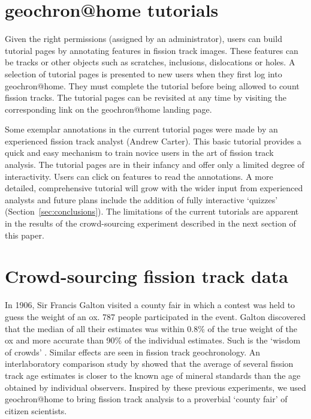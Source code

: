 \documentclass[gchron, manuscript]{copernicus}
\begin{document}
\section{geochron@home tutorials}\label{sec:tutorial}

Given the right permissions (assigned by an administrator), users can
build tutorial pages by annotating features in fission track images.
These features can be tracks or other objects such as scratches,
inclusions, dislocations or holes. A selection of tutorial pages is
presented to new users when they first log into
geochron@home. They must complete the tutorial before being
allowed to count fission tracks.  The tutorial pages can be revisited
at any time by visiting the corresponding link on the
geochron@home landing page.\medskip

Some exemplar annotations in the current tutorial pages were made by
an experienced fission track analyst (Andrew Carter). This basic
tutorial provides a quick and easy mechanism to train novice users in
the art of fission track analysis. The tutorial pages are in their
infancy and offer only a limited degree of interactivity. Users can
click on features to read the annotations. A more detailed,
comprehensive tutorial will grow with the wider input from experienced
analysts and future plans include the addition of fully interactive
`quizzes' (Section~\ref{sec:conclusions}). The limitations of the
current tutorials are apparent in the results of the crowd-sourcing
experiment described in the next section of this paper.

\section{Crowd-sourcing fission track data}\label{sec:crowdsourcing}

In 1906, Sir Francis Galton visited a county fair in which a contest
was held to guess the weight of an ox. 787 people participated in the
event. Galton discovered that the median of all their estimates was
within 0.8\% of the true weight of the ox and more accurate than 90\%
of the individual estimates. Such is the `wisdom of crowds'
\citep{galton1907a}. Similar effects are seen in fission track
geochronology. An interlaboratory comparison study by
\citet{miller1985} showed that the average of several fission track
age estimates is closer to the known age of mineral standards than the
age obtained by individual observers. Inspired by these previous
experiments, we used geochron@home to bring fission track analysis to
a proverbial `county fair' of citizen scientists.\medskip
\end{document}
